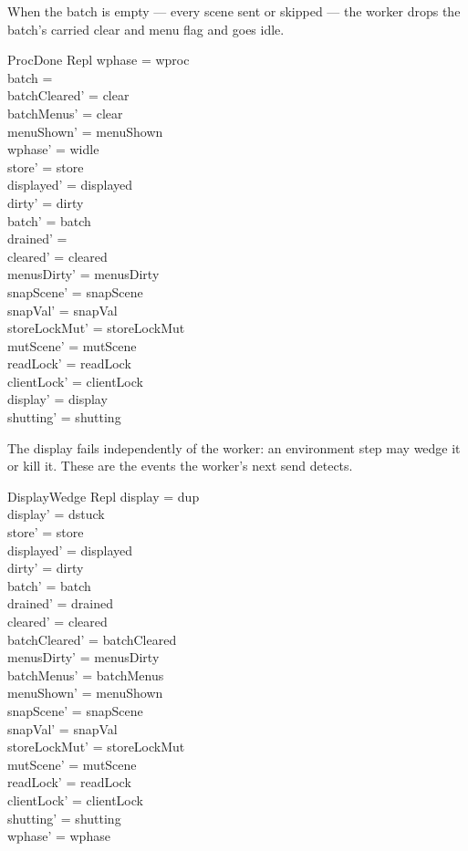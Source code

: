 \documentclass[a4paper,10pt,fleqn]{article}
\begin{document}
When the batch is empty --- every scene sent or skipped --- the worker
drops the batch's carried clear and menu flag and goes idle.

\begin{schema}{ProcDone}
  \Delta Repl
\where
  wphase = wproc \\
  batch = \emptyset \\
  batchCleared' = clear \\
  batchMenus' = clear \\
  menuShown' = menuShown \\
  wphase' = widle \\
  store' = store \\
  displayed' = displayed \\
  dirty' = dirty \\
  batch' = batch \\
  drained' = \emptyset \\
  cleared' = cleared \\
  menusDirty' = menusDirty \\
  snapScene' = snapScene \\
  snapVal' = snapVal \\
  storeLockMut' = storeLockMut \\
  mutScene' = mutScene \\
  readLock' = readLock \\
  clientLock' = clientLock \\
  display' = display \\
  shutting' = shutting
\end{schema}

The display fails independently of the worker: an environment step may
wedge it or kill it.  These are the events the worker's next send detects.

\begin{schema}{DisplayWedge}
  \Delta Repl
\where
  display = dup \\
  display' = dstuck \\
  store' = store \\
  displayed' = displayed \\
  dirty' = dirty \\
  batch' = batch \\
  drained' = drained \\
  cleared' = cleared \\
  batchCleared' = batchCleared \\
  menusDirty' = menusDirty \\
  batchMenus' = batchMenus \\
  menuShown' = menuShown \\
  snapScene' = snapScene \\
  snapVal' = snapVal \\
  storeLockMut' = storeLockMut \\
  mutScene' = mutScene \\
  readLock' = readLock \\
  clientLock' = clientLock \\
  shutting' = shutting \\
  wphase' = wphase
\end{schema}
\end{document}

